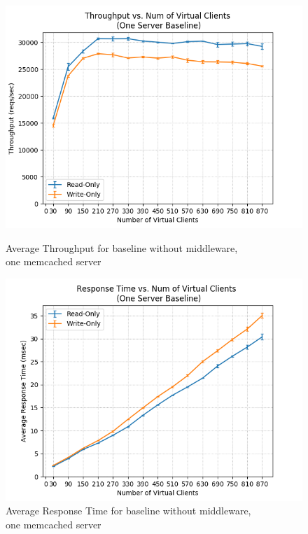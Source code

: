 \documentclass[11pt,a4paper]{article}
\begin{document}
\begin{figure}[H]
	\captionsetup{font=scriptsize,labelfont=scriptsize,justification=centering}
	\centering
	\begin{minipage}{0.5\textwidth}
		\centering
		\includegraphics[scale=0.525]{images/2a_one_mc_tps.png}
		\caption{Average Throughput for baseline without middleware,\\ one memcached server}
		\label{tps_1_mc_baseline}
	\end{minipage}\hfill
	\begin{minipage}{0.5\textwidth}
		\centering
		\includegraphics[scale=0.525]{images/2a_one_mc_rt.png}
		\caption{Average Response Time for baseline without middleware,\\ one memcached server}
		\label{rt_1_mc_baseline}
	\end{minipage}
\end{figure}
\end{document}
